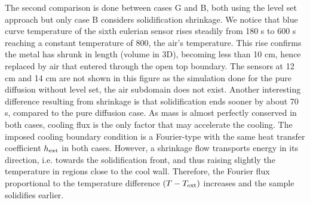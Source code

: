 The second comparison is done between cases G and B, both using the level set approach but only case B considers solidification shrinkage.
We notice that blue curve temperature of the sixth 
eulerian sensor rises steadily from 180 s to 600 s reaching a constant temperature of \SI{800}{\udegC}, the air's temperature. 
This rise confirms the metal has shrunk in length (volume in 3D),
becoming less than 10 cm, hence replaced by air that entered through the open top boundary.
The sensors at 12 cm and 14 cm are not shown in this figure as the simulation done for the pure diffusion without level set, the air subdomain does not exist.
Another interesting difference resulting from shrinkage is that solidification ends sooner by about 70 s, compared to the pure diffusion case.
As mass is almost perfectly conserved in both cases, cooling flux is the only factor that may accelerate the cooling. The imposed cooling boundary condition
is a Fourier-type with the same heat transfer coefficient $h_{\text{ext}}$ in both cases. However, a shrinkage flow transports energy in its direction, i.e. towards the solidification
front, and thus raising slightly the temperature in regions close to the cool wall. Therefore, the Fourier flux proportional to the temperature difference $(T-T_{\text{ext}})$ increases
and the sample solidifies earlier. 

